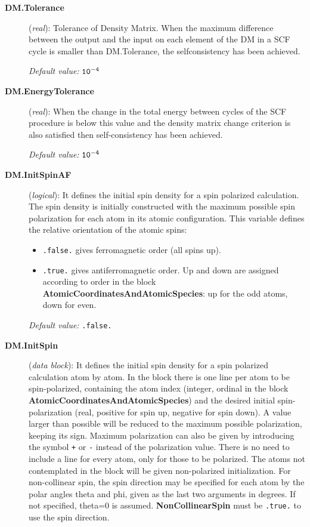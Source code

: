 \documentclass[11pt]{article}
\begin{document}
\begin{description}
\item[{\bf DM.Tolerance}] ({\it real}): 
Tolerance of Density Matrix.
When the maximum difference between the output and the
input on each element of the DM 
in a SCF cycle is smaller than DM.Tolerance,
the selfconsistency has been achieved.

{\it Default value:} {${\tt 10^{-4}}$}


\item[{\bf DM.EnergyTolerance}] ({\it real}): 
When the change in the total energy between cycles
of the SCF procedure is below this value and the
density matrix change criterion is also satisfied
then self-consistency has been achieved.

{\it Default value:} {${\tt 10^{-4}}$}

\item[{\bf DM.InitSpinAF}] ({\it logical}):
It defines the initial spin density for a spin polarized calculation. 
The spin density is initially constructed with the maximum possible
spin polarization for each atom in its atomic configuration.
This variable defines the relative orientation of the atomic
spins: 

\begin{itemize}
\item {\tt .false.} gives ferromagnetic order (all spins up).
\item {\tt .true.} gives antiferromagnetic order. Up and down are
assigned according to order in the block 
{\bf AtomicCoordinatesAndAtomicSpecies}: up for the odd atoms, down for even.
\end{itemize}

{\it Default value:} {\tt .false.}


\item[{\bf DM.InitSpin}] ({\it data block}): 
 It defines the
initial spin density for a spin polarized calculation atom by atom.
In the block there is one line per atom to be spin-polarized, 
containing the atom index (integer, ordinal in the block
{\bf AtomicCoordinatesAndAtomicSpecies}) and the desired
initial spin-polarization (real, positive for spin up, negative for
spin down). A value larger than possible will be reduced
to the maximum possible polarization, keeping its sign. 
Maximum polarization can also be given by introducing the
symbol {\tt +} or {\tt -} instead of the polarization value.
There is no need to include a line for every atom, only for
those to be polarized. The atoms not contemplated in the block will
be given non-polarized initialization.
For non-collinear spin, the spin direction may be specified for
each atom by the polar angles theta and phi, given as the last
two arguments in degrees. If not specified, theta=0 is assumed.
{\bf NonCollinearSpin} must be {\tt .true.} to use the spin direction.


\end{description}
\end{document}
